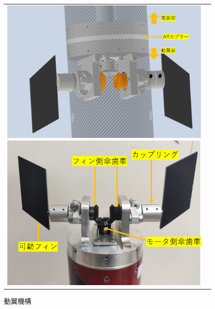 \documentclass[a4paper,11pt,uplatex]{jsarticle}
\begin{document}
\begin{figure}[H]
	\begin{center}
		\begin{tabular}{cc}
			\begin{minipage}{0.5\hsize}
				\centering
				\includegraphics[scale=0.25]{pic_str/s_roll_all.png}
				\caption{動翼機構CAD図}
				\label{s_r_all}
			\end{minipage}
			\begin{minipage}{0.5\hsize}
				\centering
				\includegraphics[scale=0.47]{pic_str/s_r_pic.png}
				\caption{動翼機構}
				\label{s_r_pic}
			\end{minipage}
		\end{tabular}
	\end{center}
\end{figure}
\end{document}
